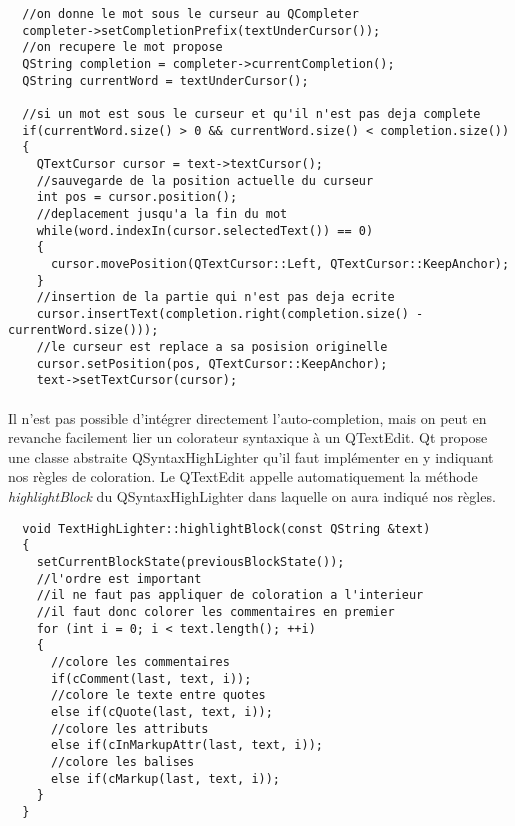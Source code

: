 \begin{lstlisting}
  //on donne le mot sous le curseur au QCompleter
  completer->setCompletionPrefix(textUnderCursor());
  //on recupere le mot propose
  QString completion = completer->currentCompletion();
  QString currentWord = textUnderCursor();

  //si un mot est sous le curseur et qu'il n'est pas deja complete
  if(currentWord.size() > 0 && currentWord.size() < completion.size())
  {
    QTextCursor cursor = text->textCursor();
    //sauvegarde de la position actuelle du curseur
    int pos = cursor.position();
    //deplacement jusqu'a la fin du mot
    while(word.indexIn(cursor.selectedText()) == 0)
    {
      cursor.movePosition(QTextCursor::Left, QTextCursor::KeepAnchor);
    }
    //insertion de la partie qui n'est pas deja ecrite
    cursor.insertText(completion.right(completion.size() - currentWord.size()));
    //le curseur est replace a sa posision originelle
    cursor.setPosition(pos, QTextCursor::KeepAnchor);
    text->setTextCursor(cursor);
\end{lstlisting}
\paragraph{}
Il n'est pas possible d'intégrer directement l'auto-completion, mais on peut en revanche facilement lier un colorateur syntaxique à un QTextEdit. Qt propose une classe abstraite QSyntaxHighLighter qu'il faut implémenter en y indiquant nos règles de coloration. Le QTextEdit appelle automatiquement la méthode \textit{highlightBlock} du QSyntaxHighLighter dans laquelle on aura indiqué nos règles.

\begin{lstlisting}
  void TextHighLighter::highlightBlock(const QString &text)
  {
    setCurrentBlockState(previousBlockState());
    //l'ordre est important
    //il ne faut pas appliquer de coloration a l'interieur
    //il faut donc colorer les commentaires en premier
    for (int i = 0; i < text.length(); ++i)
    {
      //colore les commentaires
      if(cComment(last, text, i));
      //colore le texte entre quotes
      else if(cQuote(last, text, i));
      //colore les attributs
      else if(cInMarkupAttr(last, text, i));
      //colore les balises
      else if(cMarkup(last, text, i));
    }
  }
\end{lstlisting}
